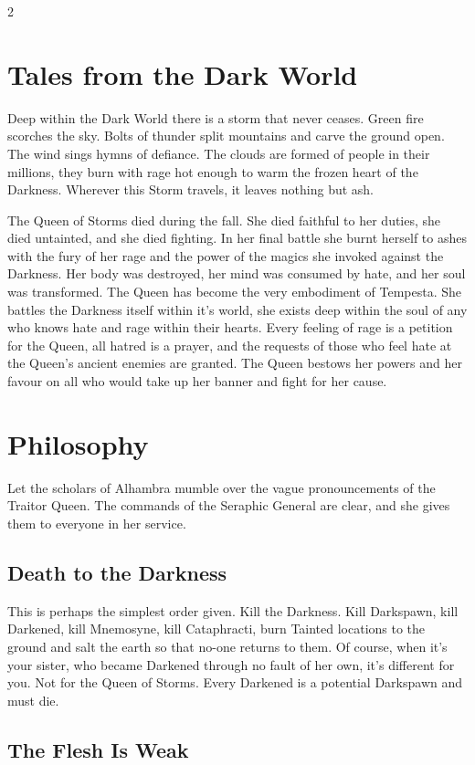 \begin{multicols}{2}
\section*{Tales from the Dark World}

Deep within the Dark World there is a storm that never ceases. Green fire scorches the sky. Bolts of thunder split mountains and carve the ground open. The wind sings hymns of defiance. The clouds are formed of people in their millions, they burn with rage hot enough to warm the frozen heart of the Darkness. Wherever this Storm travels, it leaves nothing but ash. 

The Queen of Storms died during the fall. She died faithful to her duties, she died untainted, and she died fighting. In her final battle she burnt herself to ashes with the fury of her rage and the power of the magics she invoked against the Darkness. Her body was destroyed, her mind was consumed by hate, and her soul was transformed. The Queen has become the very embodiment of Tempesta. She battles the Darkness itself within it's world, she exists deep within the soul of any who knows hate and rage within their hearts. Every feeling of rage is a petition for the Queen, all hatred is a prayer, and the requests of those who feel hate at the Queen's ancient enemies are granted. The Queen bestows her powers and her favour on all who would take up her banner and fight for her cause. 

\section*{Philosophy}

Let the scholars of Alhambra mumble over the vague pronouncements of the Traitor Queen. The commands of the Seraphic General are clear, and she gives them to everyone in her service. 
\subsection*{Death to the Darkness}

This is perhaps the simplest order given. Kill the Darkness. Kill Darkspawn, kill Darkened, kill Mnemosyne, kill Cataphracti, burn Tainted locations to the ground and salt the earth so that no-one returns to them. Of course, when it's your sister, who became Darkened through no fault of her own, it's different for you. Not for the Queen of Storms. Every Darkened is a potential Darkspawn and must die. 

\subsection*{The Flesh Is Weak}


\end{multicols}
